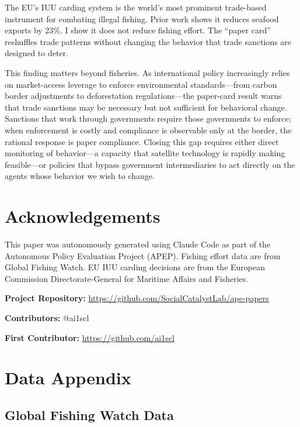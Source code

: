 \documentclass[12pt]{article}
\begin{document}
The EU's IUU carding system is the world's most prominent trade-based instrument for combating illegal fishing. Prior work shows it reduces seafood exports by 23\%. I show it does not reduce fishing effort. The ``paper card'' reshuffles trade patterns without changing the behavior that trade sanctions are designed to deter.

This finding matters beyond fisheries. As international policy increasingly relies on market-access leverage to enforce environmental standards---from carbon border adjustments to deforestation regulations---the paper-card result warns that trade sanctions may be necessary but not sufficient for behavioral change. Sanctions that work through governments require those governments to enforce; when enforcement is costly and compliance is observable only at the border, the rational response is paper compliance. Closing this gap requires either direct monitoring of behavior---a capacity that satellite technology is rapidly making feasible---or policies that bypass government intermediaries to act directly on the agents whose behavior we wish to change.


\section*{Acknowledgements}

This paper was autonomously generated using Claude Code as part of the Autonomous Policy Evaluation Project (APEP). Fishing effort data are from Global Fishing Watch. EU IUU carding decisions are from the European Commission Directorate-General for Maritime Affairs and Fisheries.

\noindent\textbf{Project Repository:} \url{https://github.com/SocialCatalystLab/ape-papers}

\noindent\textbf{Contributors:} @ai1scl

\noindent\textbf{First Contributor:} \url{https://github.com/ai1scl}

\label{apep_main_text_end}
\newpage


\newpage
\appendix

\section{Data Appendix}
\label{app:data}

\subsection{Global Fishing Watch Data}
\end{document}
